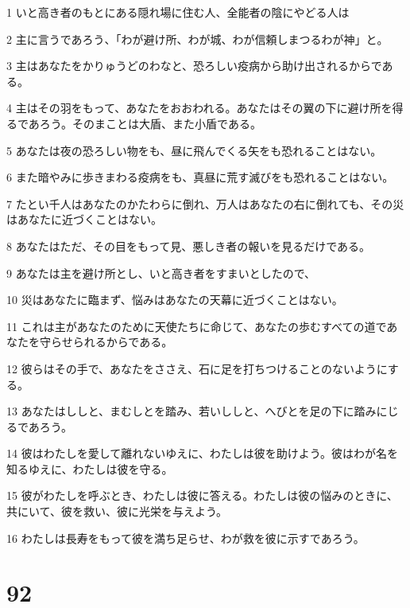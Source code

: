 \par 1 いと高き者のもとにある隠れ場に住む人、全能者の陰にやどる人は
\par 2 主に言うであろう、「わが避け所、わが城、わが信頼しまつるわが神」と。
\par 3 主はあなたをかりゅうどのわなと、恐ろしい疫病から助け出されるからである。
\par 4 主はその羽をもって、あなたをおおわれる。あなたはその翼の下に避け所を得るであろう。そのまことは大盾、また小盾である。
\par 5 あなたは夜の恐ろしい物をも、昼に飛んでくる矢をも恐れることはない。
\par 6 また暗やみに歩きまわる疫病をも、真昼に荒す滅びをも恐れることはない。
\par 7 たとい千人はあなたのかたわらに倒れ、万人はあなたの右に倒れても、その災はあなたに近づくことはない。
\par 8 あなたはただ、その目をもって見、悪しき者の報いを見るだけである。
\par 9 あなたは主を避け所とし、いと高き者をすまいとしたので、
\par 10 災はあなたに臨まず、悩みはあなたの天幕に近づくことはない。
\par 11 これは主があなたのために天使たちに命じて、あなたの歩むすべての道であなたを守らせられるからである。
\par 12 彼らはその手で、あなたをささえ、石に足を打ちつけることのないようにする。
\par 13 あなたはししと、まむしとを踏み、若いししと、へびとを足の下に踏みにじるであろう。
\par 14 彼はわたしを愛して離れないゆえに、わたしは彼を助けよう。彼はわが名を知るゆえに、わたしは彼を守る。
\par 15 彼がわたしを呼ぶとき、わたしは彼に答える。わたしは彼の悩みのときに、共にいて、彼を救い、彼に光栄を与えよう。
\par 16 わたしは長寿をもって彼を満ち足らせ、わが救を彼に示すであろう。

\chapter{92}

